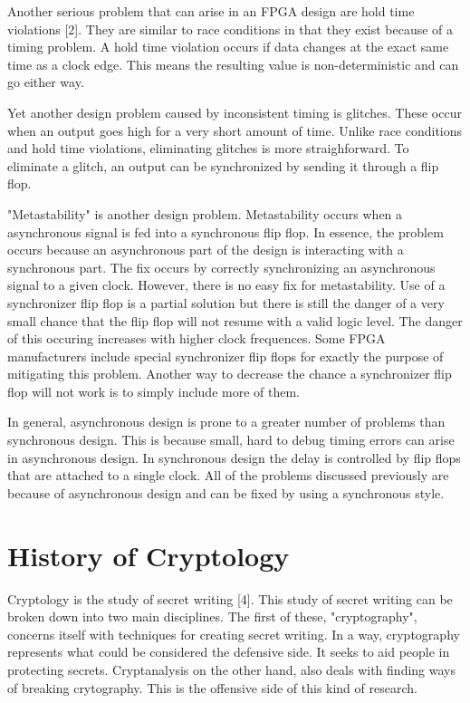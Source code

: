 \documentclass{article}
\begin{document}
    Another serious problem that can arise in an FPGA design are hold time violations [2].
    They are similar to race conditions in that they exist because of a timing problem.
    A hold time violation occurs if data changes at the exact same time as a clock edge.
    This means the resulting value is non-deterministic and can go either way.

    Yet another design problem caused by inconsistent timing is glitches. These occur
    when an output goes high for a very short amount of time. Unlike race conditions
    and hold time violations, eliminating glitches is more straighforward.
    To eliminate a glitch, an output can be synchronized by sending it through a flip flop.

    "Metastability" is another design problem. Metastability occurs when a asynchronous
    signal is fed into a synchronous flip flop. In essence, the problem occurs because
    an asynchronous part of the design is interacting with a synchronous part.
    The fix occurs by correctly synchronizing an asynchronous signal to a given clock.
    However, there is no easy fix for metastability. Use of a synchronizer flip flop
    is a partial solution but there is still the danger of a very small chance
    that the flip flop will not resume with a valid logic level. The danger of this occuring
    increases with higher clock frequences. Some FPGA manufacturers include special
    synchronizer flip flops for exactly the purpose of mitigating this problem.
    Another way to decrease the chance a synchronizer flip flop will not work is
    to simply include more of them.

    In general, asynchronous design is prone to a greater number of problems
    than synchronous design. This is because small, hard to debug timing errors
    can arise in asynchronous design.
    In synchronous design the delay is controlled by flip flops that are attached
    to a single clock.
    All of the problems discussed previously are because of asynchronous design
    and can be fixed by using a synchronous style.

    \section{History of Cryptology}

    Cryptology is the study of secret writing [4]. This study of secret writing
    can be broken down into two main disciplines.
    The first of these, "cryptography", concerns itself with techniques
    for creating secret writing. In a way, cryptography represents what could
    be considered the defensive side. It seeks to aid people in
    protecting secrets.
    Cryptanalysis on the other hand, also deals with finding ways of breaking
    crytography. This is the offensive side of this kind of research.
\end{document}
